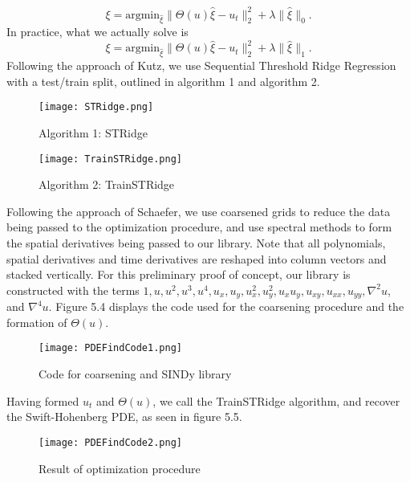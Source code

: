 \documentclass[12pt]{article}
\numberwithin{equation}{section}
\begin{document}
\begin{equation}
    \xi = \text{argmin}_{\hat{\xi}}\| \Theta(u)\hat{\xi}-u_t\|_2^{2}+\lambda \|\hat{\xi}\|_{0}.
\end{equation}
In practice, what we actually solve is
\begin{equation}
    \xi = \text{argmin}_{\hat{\xi}}\| \Theta(u)\hat{\xi}-u_t\|_2^2+\lambda \|\hat{\xi}\|_{1}.
\end{equation}
Following the approach of Kutz, we use Sequential Threshold Ridge Regression with a test/train split, outlined in algorithm 1 and algorithm 2.
\begin{figure}
\centering
\texttt{[image: STRidge.png]}
\caption{Algorithm 1: STRidge}
\end{figure}
\begin{figure}
\centering
\texttt{[image: TrainSTRidge.png]}
\caption{Algorithm 2: TrainSTRidge}
\end{figure}
\par Following the approach of Schaefer, we use coarsened grids to reduce the data being passed to the optimization procedure, and use spectral methods to form the spatial derivatives being passed to our library. Note that all polynomials, spatial derivatives and time derivatives are reshaped into column vectors and stacked vertically. For this preliminary proof of concept, our library is constructed with the terms $1,u,u^2,u^3,u^4,u_x, u_y, u_x^2, u_y^2, u_x u_y, u_{xy}, u_{xx}, u_{yy},\nabla^2u$, and $\nabla^4 u$. Figure 5.4 displays the code used for the coarsening procedure and the formation of $\Theta(u)$.
\begin{figure}
\centering
\texttt{[image: PDEFindCode1.png]}
\caption{Code for coarsening and SINDy library}
\end{figure}
\par Having formed $u_t$ and $\Theta(u)$, we call the TrainSTRidge algorithm, and recover the Swift-Hohenberg PDE, as seen in figure 5.5.
\begin{figure}
\centering
\texttt{[image: PDEFindCode2.png]}
\caption{Result of optimization procedure}
\end{figure}
\end{document}
